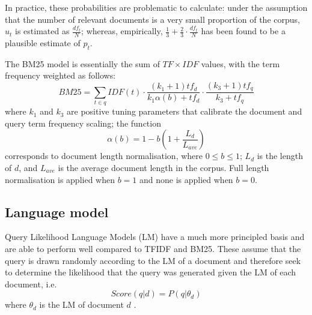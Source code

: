 In practice, these probabilities are problematic to calculate: under the assumption that the number of relevant documents is a very small proportion of the corpus, $u_t$ is estimated as $\frac{df_t}{N}$; whereas, empirically, $\frac{1}{3} + \frac{2}{3}\cdot\frac{df_t}{N}$ has been found to be a plausible estimate of $p_t$.  

The BM25 model \cite{robertson:1994} is essentially the sum of $TF \times IDF$ values, with the term frequency weighted as follows: 
\begin{equation}
BM25 = \sum_{t \in q} IDF(t) \cdot \frac{(k_1 + 1) tf_d}{k_1\alpha(b) + tf_d}\cdot \frac{(k_3 + 1)tf_q}{k_3 + tf_q} 
\end{equation}
where $k_1$ and $k_3$ are positive tuning parameters that calibrate the document and query term frequency scaling; the function
\begin{equation}
 \alpha(b) = 1 - b(1 + \frac{L_d}{L_{ave}})
\end{equation}
corresponds to document length normalisation, where $0 \leq b \leq 1$; $L_d$ is the length of $d$, and $L_{ave}$ is the average document length in the corpus. Full length normalisation is applied when $b = 1$ and none is applied when $b = 0$. 
\subsection{Language model}
Query Likelihood Language Models (LM) have a much more principled basis and are able to perform well compared to TFIDF and BM25. These assume that the query is drawn randomly according to the LM of a document and therefore seek to determine the likelihood that the query was generated given the LM of each document, i.e. 
\begin{equation}
Score(q|d) = P(q|\theta_d) 
\end{equation}
where $\theta_d$ is the LM of document $d$ \cite{hiemstra:1999, ponte:1998, crestani:1998}. 

